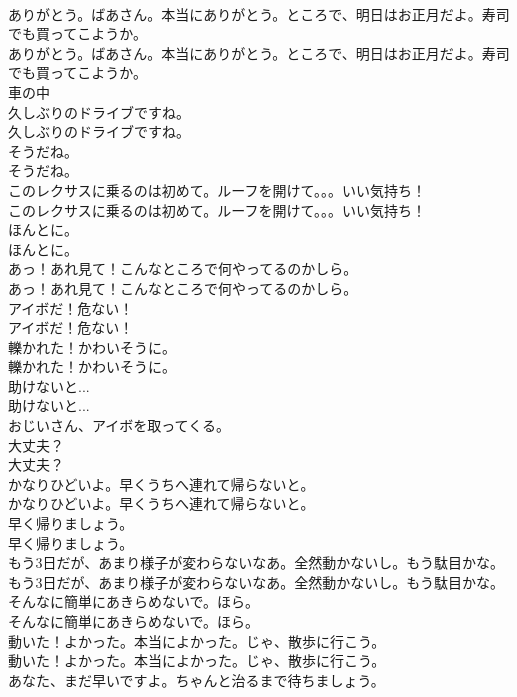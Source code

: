 \documentclass[8pt]{extreport}
\begin{document}
\begin{CJK}{UTF8}{min}
\\	ありがとう。ばあさん。本当にありがとう。ところで、明日はお正月だよ。寿司でも買ってこようか。	
\\	ありがとう。ばあさん。本当にありがとう。ところで、明日はお正月だよ。寿司でも買ってこようか。 
\\	車の中
\\	久しぶりのドライブですね。	
\\	久しぶりのドライブですね。 
\\	そうだね。	
\\	そうだね。 
\\	このレクサスに乗るのは初めて。ルーフを開けて。。。いい気持ち！	
\\	このレクサスに乗るのは初めて。ルーフを開けて。。。いい気持ち！ 
\\	ほんとに。	
\\	ほんとに。 
\\	あっ！あれ見て！こんなところで何やってるのかしら。	
\\	あっ！あれ見て！こんなところで何やってるのかしら。 
\\	アイボだ！危ない！	
\\	アイボだ！危ない！ 
\\	轢かれた！かわいそうに。	
\\	轢かれた！かわいそうに。 
\\	助けないと...	
\\	助けないと... 
\\	おじいさん、アイボを取ってくる。
\\	大丈夫？	
\\	大丈夫？ 
\\	かなりひどいよ。早くうちへ連れて帰らないと。	
\\	かなりひどいよ。早くうちへ連れて帰らないと。 
\\	早く帰りましょう。	
\\	早く帰りましょう。 
\\	もう3日だが、あまり様子が変わらないなあ。全然動かないし。もう駄目かな。	
\\	もう3日だが、あまり様子が変わらないなあ。全然動かないし。もう駄目かな。 
\\	そんなに簡単にあきらめないで。ほら。	
\\	そんなに簡単にあきらめないで。ほら。 
\\	動いた！よかった。本当によかった。じゃ、散歩に行こう。	
\\	動いた！よかった。本当によかった。じゃ、散歩に行こう。 
\\	あなた、まだ早いですよ。ちゃんと治るまで待ちましょう。	

\end{CJK}
\end{document}
